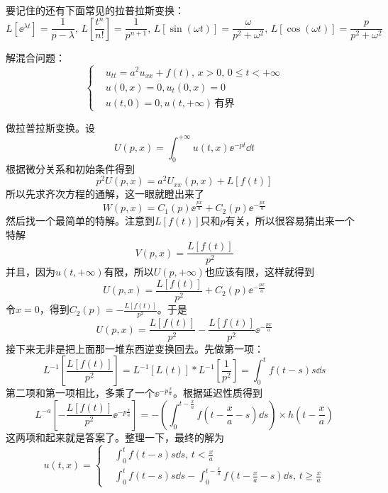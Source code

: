 要记住的还有下面常见的拉普拉斯变换：
\color{red}
\[L[\ee^{\lambda t}] = \frac{1}{p - \lambda},\, L[\frac{t^n}{n!}] = \frac{1}{p^{n+1}},\,L[\sin(\omega t)] = \frac{\omega}{p^2 + \omega^2},\, L[\cos(\omega t)] = \frac{p}{p^2 + \omega^2}\]
\color{black}
\begin{problembox}
\begin{example}
    解混合问题：
    \begin{equation*}
        \left\{
    \begin{aligned}
        &u_{tt} = a^2 u_{xx} + f\left(t\right),\, x>0, \,0 \leq t<+\infty\\
        &u(0, x) = 0, u_t(0, x) = 0\\
        &u(t, 0) = 0, u(t, +\infty)\,\text{有界}  
    \end{aligned}
    \right.
    \end{equation*}
\end{example}
\begin{solution}
做拉普拉斯变换。设
\[U(p, x) = \int_{0}^{+\infty} u(t, x) \ee^{- p t} \dd{t}\]
根据微分关系和初始条件得到
\[p^2 U(p, x) = a^2 U_{xx}(p, x) + L[f(t)]\]
所以先求齐次方程的通解，这一眼就瞪出来了
\[W(p, x) = C_1(p) \ee^{\frac{px}{a}} + C_2(p) \ee^{-\frac{px}{a}}\]
然后找一个最简单的特解。注意到$L[f(t)]$只和$p$有关，所以很容易猜出来一个特解
\[V(p, x) = \frac{L[f(t)]}{p^2}\]
并且，因为$u(t, +\infty)$有限，所以$U(p, +\infty)$也应该有限，这样就得到
\[U(p, x) = \frac{L[f(t)]}{p^2} + C_2(p) \ee^{-\frac{px}{a}}\]
令$x = 0$，得到$C_2(p) = -\frac{L[f(t)]}{p^2}$。于是
\[U(p, x) = \frac{L[f(t)]}{p^2} - \frac{L[f(t)]}{p^2} \ee^{-\frac{p x}{a}}\]
接下来无非是把上面那一堆东西逆变换回去。先做第一项：
\[L^{-1}\left[\frac{L[f(t)]}{p^2}\right] = L^{-1}[L(t)] * L^{-1}[\frac{1}{p^2}] = \int_{0}^{t} f(t - s) s \dd{s}\]
第二项和第一项相比，多乘了一个$\ee^{-p \frac{x}{a}}$。根据延迟性质得到
\[L^{-a}\left[-\frac{L[f(t)]}{p^2} \ee^{-p \frac{x}{a}}\right] = -\left(\int_{0}^{t - \frac{x}{a}} f\left(t - \frac{x}{a} - s\right) \dd{s}\right) \times h(t - \frac{x}{a})\]
这两项和起来就是答案了。整理一下，最终的解为
\begin{equation*}
    u(t, x) = 
    \left\{
        \begin{aligned}
            &\int_{0}^{t} f(t - s) s \dd{s},\, t < \frac{x}{a}\\
            &\int_{0}^{t} f(t - s) s \dd{s} - \int_{0}^{t - \frac{x}{a}} f\left(t - \frac{x}{a} - s\right) \dd{s},\, t \geq \frac{x}{a}
        \end{aligned}
    \right.
\end{equation*}
\end{solution}
\end{problembox}
